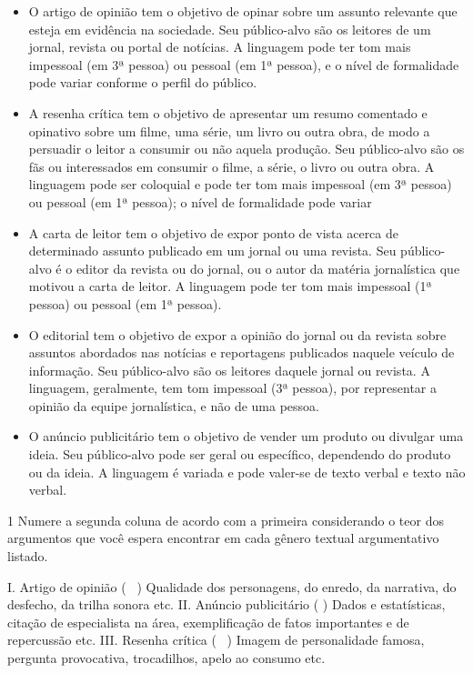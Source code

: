 \begin{itemize}
\tightlist
\item
  O artigo de opinião tem o objetivo de opinar sobre um assunto
  relevante que esteja em evidência na sociedade. Seu público-alvo são
  os leitores de um jornal, revista ou portal de notícias. A linguagem
  pode ter tom mais impessoal (em 3ª pessoa) ou pessoal (em 1ª pessoa),
  e o nível de formalidade pode variar conforme o perfil do público.
\item
  A resenha crítica tem o objetivo de apresentar um resumo comentado e
  opinativo sobre um filme, uma série, um livro ou outra obra, de modo a
  persuadir o leitor a consumir ou não aquela produção. Seu público-alvo
  são os fãs ou interessados em consumir o filme, a série, o livro ou
  outra obra. A linguagem pode ser coloquial e pode ter tom mais
  impessoal (em 3ª pessoa) ou pessoal (em 1ª pessoa); o nível de
  formalidade pode variar
\item
  A carta de leitor tem o objetivo de expor ponto de vista acerca de
  determinado assunto publicado em um jornal ou uma revista. Seu
  público-alvo é o editor da revista ou do jornal, ou o autor da matéria
  jornalística que motivou a carta de leitor. A linguagem pode ter tom
  mais impessoal (1ª pessoa) ou pessoal (em 1ª pessoa).
\item
  O editorial tem o objetivo de expor a opinião do jornal ou da revista
  sobre assuntos abordados nas notícias e reportagens publicados naquele
  veículo de informação. Seu público-alvo são os leitores daquele jornal
  ou revista. A linguagem, geralmente, tem tom impessoal (3ª pessoa),
  por representar a opinião da equipe jornalística, e não de uma pessoa.
\item
  O anúncio publicitário tem o objetivo de vender um produto ou divulgar
  uma ideia. Seu público-alvo pode ser geral ou específico, dependendo
  do produto ou da ideia. A linguagem é variada e pode valer-se de texto
  verbal e texto não verbal.
\end{itemize}


\num{1} Numere a segunda coluna de acordo com a primeira considerando o
teor dos argumentos que você espera encontrar em cada gênero textual
argumentativo listado.

I. Artigo de opinião (~ ) Qualidade dos personagens, do
enredo, da narrativa, do desfecho, da trilha sonora etc. II. Anúncio
publicitário (  ) Dados e estatísticas, citação de
especialista na área, exemplificação de fatos importantes e de
repercussão etc. III. Resenha crítica ( ~) Imagem de
personalidade famosa, pergunta provocativa, trocadilhos, apelo ao
consumo etc.

